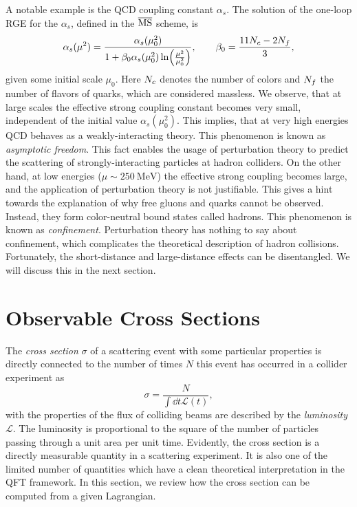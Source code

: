 A notable example is the QCD coupling constant $\alpha_s$.
The solution of the one-loop RGE for the $\alpha_s$, defined in the $\overline{\text{MS}}$ scheme, is
\begin{align}
  \alpha_s(\mu^2)=\frac{\alpha_s(\mu_0^2)}{1+\beta_0 \alpha_s(\mu_0^2)\ln(\frac{\mu^2}{\mu_0^2})}, \qquad \beta_0=\frac{11 {N_c}-2{N_f}}{3},
\end{align}
given some initial scale $\mu_0$.  
Here ${N_c}$ denotes the number of colors and ${N_f}$ the number of flavors of quarks, which are considered massless.
We observe, that at large scales the effective strong coupling constant becomes very small, independent of the initial value $\alpha_s(\mu_0^2)$.
This implies, that at very high energies QCD behaves as a weakly-interacting theory. This phenomenon is known as \emph{asymptotic freedom}.
This fact enables the usage of perturbation theory to predict the scattering of strongly-interacting particles at hadron colliders.
On the other hand, at low energies ($\mu \sim 250~\text{MeV}$) the effective strong coupling becomes large, and the application of perturbation theory is not justifiable.
This gives a hint towards the explanation of why free gluons and quarks cannot be observed.
Instead, they form color-neutral bound states called hadrons.
This phenomenon is known as \emph{confinement}. 
Perturbation theory has nothing to say about confinement, which
complicates the theoretical description of hadron collisions.
Fortunately, the short-distance and large-distance effects can be disentangled.
We will discuss this in the next section.


\section{Observable Cross Sections}
\label{sec:hadcoll}

The \emph{cross section} $\sigma$ of a scattering event with some particular properties
is directly connected to the number of times $N$ this event has occurred in a collider experiment as
\begin{equation}
\sigma  = \frac{N}{ \int \dd{t} \mathcal{L}(t)},
\end{equation}
with the properties of the flux of colliding beams are described by the \emph{luminosity} $\mathcal{L}$.
The luminosity is proportional to the square of the number of particles passing through a unit area per unit time.
Evidently, the cross section is a directly measurable quantity in a scattering experiment.
It is also one of the limited number of quantities which have a clean theoretical interpretation in the QFT framework.
In this section, we review how the cross section can be computed from a given Lagrangian.


